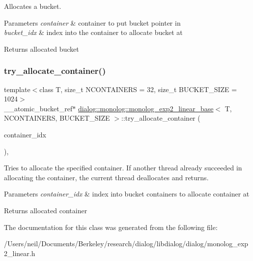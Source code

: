 Allocates a bucket. 
\begin{DoxyParams}{Parameters}
{\em container} & container to put bucket pointer in \\
\hline
{\em bucket\+\_\+idx} & index into the container to allocate bucket at \\
\hline
\end{DoxyParams}
\begin{DoxyReturn}{Returns}
allocated bucket 
\end{DoxyReturn}
\mbox{\label{classdialog_1_1monolog_1_1monolog__exp2__linear__base_a56b328aa81ec88764b1248430318a698}} 
\subsubsection{\texorpdfstring{try\+\_\+allocate\+\_\+container()}{try\_allocate\_container()}}
{\footnotesize\ttfamily template$<$class T, size\+\_\+t N\+C\+O\+N\+T\+A\+I\+N\+E\+RS = 32, size\+\_\+t B\+U\+C\+K\+E\+T\+\_\+\+S\+I\+ZE = 1024$>$ \\
\+\_\+\+\_\+atomic\+\_\+bucket\+\_\+ref$\ast$ \hyperlink{classdialog_1_1monolog_1_1monolog__exp2__linear__base}{dialog\+::monolog\+::monolog\+\_\+exp2\+\_\+linear\+\_\+base}$<$ T, N\+C\+O\+N\+T\+A\+I\+N\+E\+RS, B\+U\+C\+K\+E\+T\+\_\+\+S\+I\+ZE $>$\+::try\+\_\+allocate\+\_\+container (\begin{DoxyParamCaption}\item[{size\+\_\+t}]{container\+\_\+idx }\end{DoxyParamCaption})\hspace{0.3cm}{\ttfamily [inline]}, {\ttfamily [protected]}}

Tries to allocate the specified container. If another thread already succeeded in allocating the container, the current thread deallocates and returns. 
\begin{DoxyParams}{Parameters}
{\em container\+\_\+idx} & index into bucket containers to allocate container at \\
\hline
\end{DoxyParams}
\begin{DoxyReturn}{Returns}
allocated container 
\end{DoxyReturn}


The documentation for this class was generated from the following file\+:\begin{DoxyCompactItemize}
\item 
/\+Users/neil/\+Documents/\+Berkeley/research/dialog/libdialog/dialog/monolog\+\_\+exp2\+\_\+linear.\+h\end{DoxyCompactItemize}
